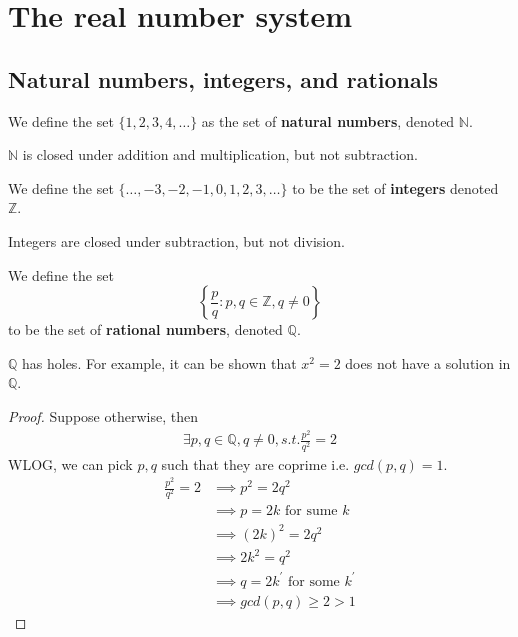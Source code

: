 \section{The real number system}

\subsection{Natural numbers, integers, and rationals}

\begin{definition}
  We define the set $\{ 1, 2, 3, 4, \hdots \} $ as the set of \textbf{natural numbers}, denoted $\mathbb{N}$.
\end{definition}
\begin{remark} $\mathbb{N}$ is closed under addition and multiplication, but not subtraction.
\end{remark}

\begin{definition}[Integers]
  We define the set $\{ \hdots, -3, -2, -1, 0, 1, 2, 3, \hdots \} $ to be the set of \textbf{integers} denoted $\mathbb{Z}$. 
\end{definition}

\begin{remark}
  Integers are closed under subtraction, but not division.
\end{remark}

\begin{definition}[Rationals] We define the set 
  \[
      \left \{ \frac{p}{q}: p, q \in \mathbb{Z}, q \neq 0  \right \} 
  \]
  to be the set of \textbf{rational numbers}, denoted $\mathbb{Q}$. 
\end{definition}

\begin{remark}
  $\mathbb{Q}$ has holes. For example, it can be shown that $x^2 = 2$ does not have a solution in $\mathbb{Q}$. 
\end{remark}
\begin{proof}
  Suppose otherwise, then 
  \begin{align*}
    \exists p, q \in \mathbb{Q}, q \neq 0, s.t. \frac{p^2}{q^2} = 2
  \end{align*}
  WLOG, we can pick $p, q$ such that they are coprime i.e. $gcd(p, q) = 1$. \\

  \begin{align*}
      \frac{p^2}{q^2} = 2 & \implies p^2 = 2 q^2 \\
      & \implies p = 2k \text{ for sume } k \\
      & \implies (2k)^2 = 2q^2 \\
      & \implies 2k^2 = q^2 \\
      & \implies q = 2k^{\prime} \text{ for some } k^{\prime} \\
      & \implies gcd(p, q) \geq 2 > 1
  \end{align*}
\end{proof}


